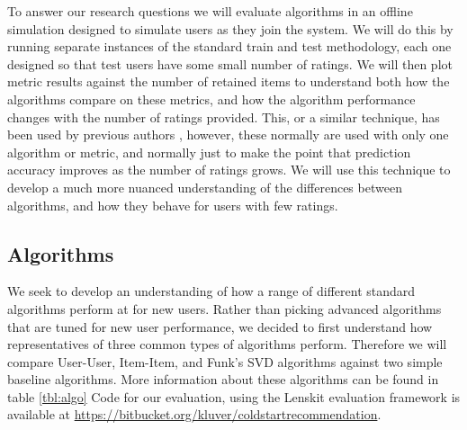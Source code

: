 \documentclass[letterpaper]{sig-alternate}
\begin{document}
  To answer our research questions we will evaluate algorithms in an offline simulation designed to simulate users as they join the system.
  We will do this by running separate instances of the standard train and test methodology, each one designed so that test users have some small number of ratings.
  We will then plot metric results against the number of retained items to understand both how the algorithms compare on these metrics, and how the algorithm performance changes with the number of ratings provided.
  This, or a similar technique, has been used by previous authors \cite{DrennerInitialExperiance, TenIsEnough, AdaptiveBootstrap}, however, these normally are used with only one algorithm or metric, and normally just to make the point that prediction accuracy improves as the number of ratings grows.
  We will use this technique to develop a much more nuanced understanding of the differences between algorithms, and how they behave for users with few ratings.
  
  \subsection*{Algorithms}

  We seek to develop an understanding of how a range of different standard algorithms perform at for new users.
  Rather than picking advanced algorithms that are tuned for new user performance, we decided to first understand how representatives of three common types of algorithms perform.
  Therefore we will compare User-User, Item-Item, and Funk's SVD algorithms against two simple baseline algorithms.
  More information about these algorithms can be found in table \ref{tbl:algo}
  Code for our evaluation, using the Lenskit evaluation framework \cite{lenskit} is available at \url{https://bitbucket.org/kluver/coldstartrecommendation}.
  
\end{document}
